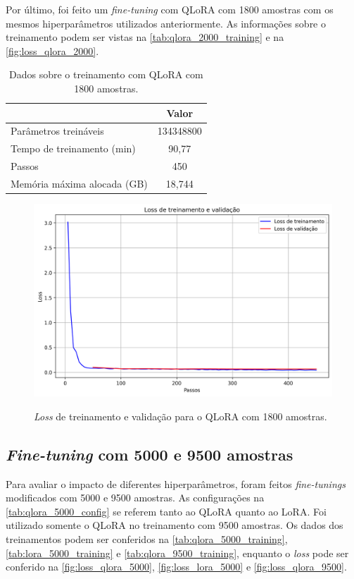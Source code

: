 Por último, foi feito um \textit{fine-tuning} com \ac{QLoRA} com 1800 amostras com os mesmos hiperparâmetros utilizados anteriormente. As informações sobre o treinamento
podem ser vistas na \autoref{tab:qlora_2000_training} e na \autoref{fig:loss_qlora_2000}.

\clearpage

\begin{table}[ht]
    \caption{\small Dados sobre o treinamento com \ac{QLoRA} com 1800 amostras.}
    \centering
    \begin{tabular}{l|c}
        \hline
                                    & Valor     \\ \hline
        Parâmetros treináveis       & 134348800 \\
        Tempo de treinamento (min)  & 90,77     \\
        Passos                      & 450       \\
        Memória máxima alocada (GB) & 18,744    \\ \hline
    \end{tabular}
    \label{tab:qlora_2000_training}
\end{table}

\begin{figure}[ht]
    \centering
    \caption{\small \textit{Loss} de treinamento e validação para o \ac{QLoRA} com 1800 amostras.}
    \includegraphics[width=0.725\columnwidth,keepaspectratio]{images/loss_qlora_2000.png}
    \label{fig:loss_qlora_2000}
\end{figure}

\subsection{\textit{Fine-tuning} com 5000 e 9500 amostras}

Para avaliar o impacto de diferentes hiperparâmetros, foram feitos \textit{fine-tunings} modificados com 5000 e 9500 amostras. As configurações na
\autoref{tab:qlora_5000_config} se referem tanto ao \ac{QLoRA} quanto ao \ac{LoRA}. Foi utilizado somente o \ac{QLoRA} no treinamento com 9500 amostras. Os dados dos
treinamentos podem ser conferidos na \autoref{tab:qlora_5000_training}, \autoref{tab:lora_5000_training} e \autoref{tab:qlora_9500_training}, enquanto o \textit{loss}
pode ser conferido na \autoref{fig:loss_qlora_5000}, \autoref{fig:loss_lora_5000} e \autoref{fig:loss_qlora_9500}.

